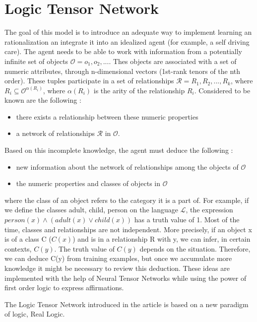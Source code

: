 \documentclass{article}
\begin{document}
\section{Logic Tensor Network}
The goal of this model is to introduce an adequate way to implement learning an rationalization an integrate it into an idealized agent (for example, a self driving care). The agent needs to be able to work with information from a potentially infinite set of objects $\mathcal{O} = {o_1, o_2, ...}$. Thes objects are associated with a set of numeric attributes, through n-dimensional vectors (1st-rank tenors of the nth order). These tuples participate in a set of relationships $\mathcal{R} = {R_1, R_2, ..., R_k}$, where $R_i \subseteq \mathcal{O}^{\alpha(R_i)}$, where $\alpha(R_i)$ is the arity of the relationship $R_i$. Considered to be known are the following \cite{LTN}:\\
\begin{itemize}
	\item there exists a relationship between these numeric properties
	\item a network of relationships $\mathcal{R}$ in $\mathcal{O}$. 
\end{itemize}

Based on this incomplete knowledge, the agent must deduce the following  \cite{LTN}:\\
\begin{itemize}
	\item new information about the network of relationships among the objects of $\mathcal{O}$
	\item the numeric properties and classes of objects in $\mathcal{O}$
\end{itemize}
where the class of an object refers to the category it is a part of. For example, if we define the classes adult, child, person on the language $\mathcal{L}$, the expression $person(x) \wedge (adult(x) \vee child(x))$ has a truth value of 1. Most of the time, classes and relationships are not independent. More precisely, if an object x is of a class C ($C(x)$) and is in a relationship R with y, we can infer, in certain contexts, $C(y)$. The truth value of $C(y)$ depends on the situation. Therefore, we can deduce C(y) from training examples, but once we accumulate more knowledge it might be necessary to review this deduction. These ideas are implemented with the help of Neural Tensor Networks while using the power of first order logic to express affirmations.

The Logic Tensor Network introduced in the article \cite{LTN} is based on a new paradigm of logic, Real Logic.
\end{document}

